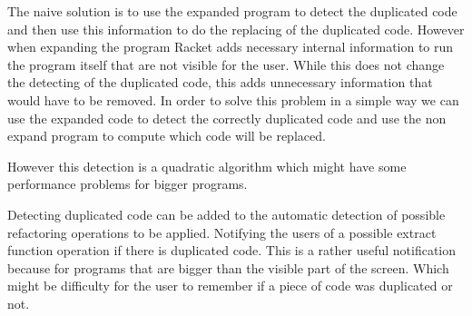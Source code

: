 The naive solution is to use the expanded program to detect the duplicated
 code and then use this information to do the replacing of the duplicated code.
However when expanding the program Racket adds necessary internal information to
run the program itself that are not visible for the user.
While this does not change the detecting of the duplicated code, this adds unnecessary information
that would have to be removed. %
In order to solve this problem in a simple way we can use the expanded code to detect
the correctly duplicated code and use the non expand program
to compute which code will be replaced.

However this detection is a quadratic algorithm which might
have some performance problems for bigger programs. %

Detecting duplicated code can be added to the automatic detection of possible refactoring operations to be applied. %
Notifying the users of a possible extract function operation if there is duplicated code.
This is a rather useful notification because for programs that are bigger than the
visible part of the screen.
Which might be difficulty for the user to remember if a piece of code was duplicated or not.





